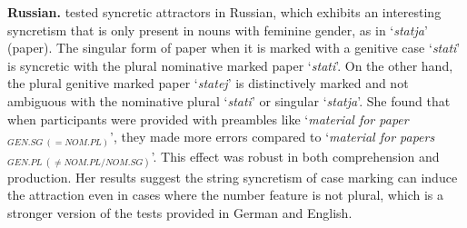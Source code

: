 \documentclass[10pt,letterpaper]{article}
\begin{document}



\textbf{Russian.}  tested syncretic attractors in Russian, which exhibits an interesting syncretism that is only present in nouns with feminine gender, as in `\textit{statja}' (paper). The singular form of paper when it is marked with a genitive case `\textit{stati}' is syncretic with the plural nominative marked paper `\textit{stati}'. On the other hand, the plural genitive marked paper `\textit{statej}' is distinctively marked and not ambiguous with the nominative plural `\textit{stati}' or singular `\textit{statja}'. She found that when participants were provided with preambles like `\textit{material for paper$_{GEN.SG\ (=NOM.PL)}$}', they made more errors compared to `\textit{material for papers$_{GEN.PL\ (\neq NOM.PL/NOM.SG)}$}'. This effect was robust in both comprehension and production. Her results suggest the string syncretism of case marking can induce the attraction even in cases where the number feature is not plural, which is a stronger version of the tests provided in German and English.
\end{document}
